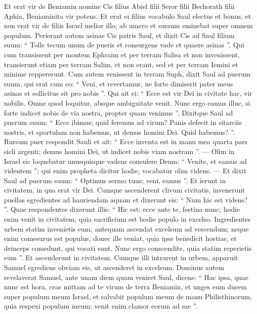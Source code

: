 \begin{biblechapter}
\begin{biblechapter}
\begin{biblechapter}
\begin{biblechapter}
\begin{biblechapter}
\begin{biblechapter}
\begin{biblechapter}
\begin{biblechapter}
\begin{biblechapter}
\verse Et erat vir de Beniamin nomine Cis filius Abiel filii Seror filii Bechorath filii Aphia, Beniaminita vir potens. 
\verse Et erat ei filius vocabulo Saul electus et bonus, et non erat vir de filiis Israel melior illo; ab umero et sursum eminebat super omnem populum.
 \verse Perierant autem asinae Cis patris Saul, et dixit Cis ad Saul filium suum: “ Tolle tecum unum de pueris et consurgens vade et quaere asinas ”. Qui cum transissent per montem Ephraim 
\verse et per terram Salisa et non invenissent, transierunt etiam per terram Salim, et non erant, sed et per terram Iemini et minime reppererunt. 
\verse Cum autem venissent in terram Suph, dixit Saul ad puerum suum, qui erat cum eo: “ Veni, et revertamur, ne forte dimiserit pater meus asinas et sollicitus sit pro nobis ”. 
\verse Qui ait ei: “ Ecce est vir Dei in civitate hac, vir nobilis. Omne quod loquitur, absque ambiguitate venit. Nunc ergo eamus illuc, si forte indicet nobis de via nostra, propter quam venimus ”. 
\verse Dixitque Saul ad puerum suum: “ Ecce ibimus; quid feremus ad virum? Panis defecit in sitarciis nostris, et sportulam non habemus, ut demus homini Dei. Quid habemus? ”. 
\verse Rursum puer respondit Sauli et ait: “ Ecce inventa est in manu mea quarta pars sicli argenti; demus homini Dei, ut indicet nobis viam nostram ”. — 
\verse Olim in Israel sic loquebatur unusquisque vadens consulere Deum: “ Venite, et eamus ad videntem ”; qui enim propheta dicitur hodie, vocabatur olim videns. — 
\verse Et dixit Saul ad puerum suum: “ Optimus sermo tuus; veni, eamus ”. Et ierunt in civitatem, in qua erat vir Dei.
 \verse Cumque ascenderent clivum civitatis, invenerunt puellas egredientes ad hauriendam aquam et dixerunt eis: “ Num hic est videns? ”. 
\verse Quae respondentes dixerunt illis: “ Hic est: ecce ante te, festina nunc; hodie enim venit in civitatem, quia sacrificium est hodie populo in excelso. 
\verse Ingredientes urbem statim invenietis eum, antequam ascendat excelsum ad vescendum; neque enim comesurus est populus, donec ille veniat, quia ipse benedicit hostiae, et deinceps comedunt, qui vocati sunt. Nunc ergo conscendite, quia statim reperietis eum ”.
 \verse Et ascenderunt in civitatem. Cumque illi intrarent in urbem, apparuit Samuel egrediens obviam eis, ut ascenderet in excelsum.
 \verse Dominus autem revelaverat Samuel, ante unam diem quam veniret Saul, dicens: 
\verse “ Hac ipsa, quae nunc est hora, cras mittam ad te virum de terra Beniamin, et unges eum ducem super populum meum Israel, et salvabit populum meum de manu Philisthinorum, quia respexi populum meum; venit enim clamor eorum ad me ”. 

\end{biblechapter}
\end{biblechapter}
\end{biblechapter}
\end{biblechapter}
\end{biblechapter}
\end{biblechapter}
\end{biblechapter}
\end{biblechapter}
\end{biblechapter}
